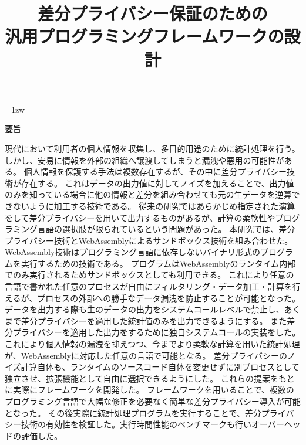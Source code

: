 \documentclass[a4paper,11pt]{jreport}
\title{差分プライバシー保証のための \\ 汎用プログラミングフレームワークの設計}
\author{}
\begin{document}
\maketitle
\thispagestyle{empty}
\newpage

\thispagestyle{empty}
\vspace*{20pt plus 1fil}
\parindent=1zw
\noindent
\begin{center}
{\Large \textbf 要旨}
\vspace{2cm}
\end{center}
現代において利用者の個人情報を収集し、多目的用途のために統計処理を行う。
しかし、安易に情報を外部の組織へ譲渡してしまうと漏洩や悪用の可能性がある。
個人情報を保護する手法は複数存在するが、その中に差分プライバシー技術が存在する。
これはデータの出力値に対してノイズを加えることで、出力値のみを知っている場合に他の情報と差分を組み合わせても元の生データを逆算できないように加工する技術である。
従来の研究ではあらかじめ指定された演算をして差分プライバシーを用いて出力するものがあるが、計算の柔軟性やプログラミング言語の選択肢が限られているという問題があった。
本研究では、差分プライバシー技術とWebAssemblyによるサンドボックス技術を組み合わせた。
WebAssembly技術はプログラミング言語に依存しないバイナリ形式のプログラムを実行するための技術である。
プログラムはWebAssemblyのランタイム内部でのみ実行されるためサンドボックスとしても利用できる。
これにより任意の言語で書かれた任意のプロセスが自由にフィルタリング・データ加工・計算を行えるが、プロセスの外部への勝手なデータ漏洩を防止することが可能となった。
データを出力する際も生のデータの出力をシステムコールレベルで禁止し、あくまで差分プライバシーを適用した統計値のみを出力できるようにする。
また差分プライバシーを適用した出力をするために独自システムコールの実装をした。
これにより個人情報の漏洩を抑えつつ、今までより柔軟な計算を用いた統計処理が、WebAssemblyに対応した任意の言語で可能となる。
差分プライバシーのノイズ計算自体も、ランタイムのソースコード自体を変更せずに別プロセスとして独立させ、拡張機能として自由に選択できるようにした。
これらの提案をもとに実際にフレームワークを開発した。
フレームワークを用いることで、複数のプログラミング言語で大幅な修正を必要なく簡単な差分プライバシー導入が可能となった。
その後実際に統計処理プログラムを実行することで、差分プライバシー技術の有効性を検証した。実行時間性能のベンチマークも行いオーバーヘッドの評価した。

\par
\vspace{0pt plus 1fil}
\newpage

\tableofcontents
\listoffigures
\end{document}
